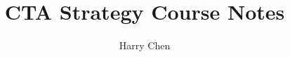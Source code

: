 
\def\BOOKMODE{}          %


\title{CTA Strategy \midot{} Course Notes}
\author{Harry Chen}
\date{}



\maketitle
\tableofcontents

% 





% 
% 
% 
% 
% 


